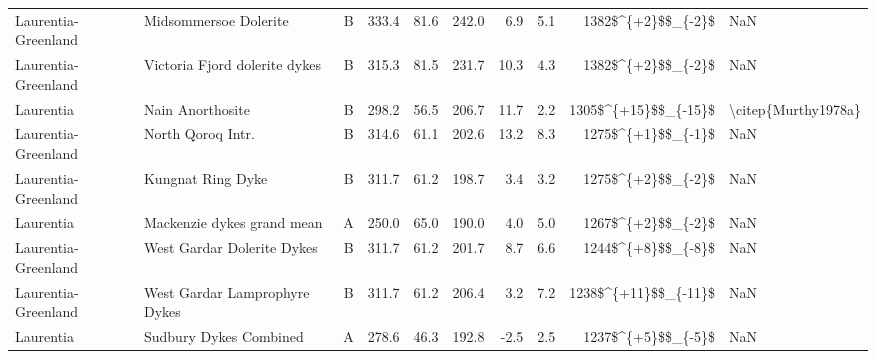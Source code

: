 \begin{longtable}{p{1 in}p{1 in}rrrrrrr}
           Laurentia-Greenland &                              Midsommersoe Dolerite &      B &     333.4 &      81.6 & 242.0 &   6.9 &       5.1 &     1382\$\textasciicircum \{+2\}\$\$\_\{-2\}\$ &                                                NaN \\
           Laurentia-Greenland &                      Victoria Fjord dolerite dykes &      B &     315.3 &      81.5 & 231.7 &  10.3 &       4.3 &     1382\$\textasciicircum \{+2\}\$\$\_\{-2\}\$ &                                                NaN \\
                     Laurentia &                                   Nain Anorthosite &      B &     298.2 &      56.5 & 206.7 &  11.7 &       2.2 &   1305\$\textasciicircum \{+15\}\$\$\_\{-15\}\$ &                                \textbackslash citep\{Murthy1978a\} \\
           Laurentia-Greenland &                                  North Qoroq Intr. &      B &     314.6 &      61.1 & 202.6 &  13.2 &       8.3 &     1275\$\textasciicircum \{+1\}\$\$\_\{-1\}\$ &                                                NaN \\
           Laurentia-Greenland &                                  Kungnat Ring Dyke &      B &     311.7 &      61.2 & 198.7 &   3.4 &       3.2 &     1275\$\textasciicircum \{+2\}\$\$\_\{-2\}\$ &                                                NaN \\
                     Laurentia &                         Mackenzie dykes grand mean &      A &     250.0 &      65.0 & 190.0 &   4.0 &       5.0 &     1267\$\textasciicircum \{+2\}\$\$\_\{-2\}\$ &                                                NaN \\
           Laurentia-Greenland &                         West Gardar Dolerite Dykes &      B &     311.7 &      61.2 & 201.7 &   8.7 &       6.6 &     1244\$\textasciicircum \{+8\}\$\$\_\{-8\}\$ &                                                NaN \\
           Laurentia-Greenland &                      West Gardar Lamprophyre Dykes &      B &     311.7 &      61.2 & 206.4 &   3.2 &       7.2 &   1238\$\textasciicircum \{+11\}\$\$\_\{-11\}\$ &                                                NaN \\
                     Laurentia &                             Sudbury Dykes Combined &      A &     278.6 &      46.3 & 192.8 &  -2.5 &       2.5 &     1237\$\textasciicircum \{+5\}\$\$\_\{-5\}\$ &                                                NaN \\

\end{longtable}
